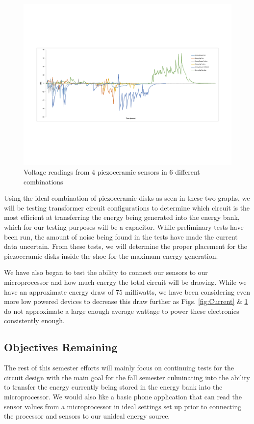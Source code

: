 \documentclass[letterpaper, 12 pt, onecolumn, hidelinks]{ieeetran}
\begin{document}
\begin{figure}[h]
	\begin{center}
		\includegraphics[trim=55 200 75 170, clip, width=\columnwidth]{Voltage.pdf}
	\end{center}
	\vspace{-1em}
	\caption{\label{fig:Voltage}Voltage readings from 4 piezoceramic sensors in 6 different combinations}
\end{figure}

Using the ideal combination of piezoceramic disks as seen in these two graphs, we will be testing transformer circuit configurations to determine which circuit is the most efficient at transferring the energy being generated into the energy bank, which for our testing purposes will be a capacitor. While preliminary tests have been run, the amount of noise being found in the tests have made the current data uncertain. From these tests, we will determine the proper placement for the piezoceramic disks inside the shoe for the maximum energy generation.

We have also began to test the ability to connect our sensors to our microprocessor and how much energy the total circuit will be drawing. While we have an approximate energy draw of 75 milliwatts, we have been considering even more low powered devices to decrease this draw further as Figs. \ref{fig:Current} \& \ref{fig:Voltage} do not approximate a large enough average wattage to power these electronics consistently enough.

\subsection{Objectives Remaining}\label{sec:Remaining}
The rest of this semester efforts will mainly focus on continuing tests for the circuit design with the main goal for the fall semester culminating into the ability to transfer the energy currently being stored in the energy bank into the microprocessor. We would also like a basic phone application that can read the sensor values from a microprocessor in ideal settings set up prior to connecting the processor and sensors to our unideal energy source.
\end{document}
